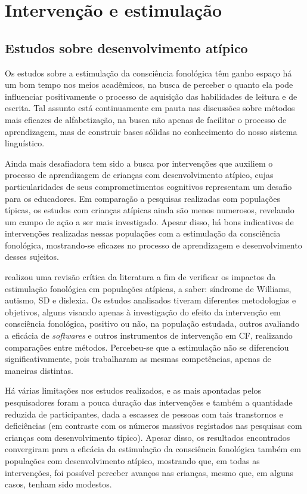 \documentclass[output=paper,colorlinks,citecolor=brown,booklanguage=portuguese]{langscibook}
\begin{document}
\section{Intervenção e estimulação}

\subsection{Estudos sobre desenvolvimento atípico}

Os estudos sobre a estimulação da consciência fonológica têm ganho espaço há um bom tempo nos meios acadêmicos, na busca de perceber o quanto ela pode influenciar positivamente o processo de aquisição das habilidades de leitura e de escrita. Tal assunto está continuamente em pauta nas discussões sobre métodos mais eficazes de alfabetização, na busca não apenas de facilitar o processo de aprendizagem, mas de construir bases sólidas no conhecimento do nosso sistema linguístico.

Ainda mais desafiadora tem sido a busca por intervenções que auxiliem o processo de aprendizagem de crianças com desenvolvimento atípico, cujas particularidades de seus comprometimentos cognitivos representam um desafio para os educadores. Em comparação a pesquisas realizadas com populações típicas, os estudos com crianças atípicas ainda são menos numerosos, revelando um campo de ação a ser mais investigado. Apesar disso, há bons indicativos de intervenções realizadas nessas populações com a estimulação da consciência fonológica, mostrando-se eficazes no processo de aprendizagem e desenvolvimento desses sujeitos.

\citet{Marques2018} realizou uma revisão crítica da literatura a fim de verificar os impactos da estimulação fonológica em populações atípicas, a saber: síndrome de Williams, autismo, SD e dislexia. Os estudos analisados tiveram diferentes metodologias e objetivos, alguns visando apenas à investigação do efeito da intervenção em consciência fonológica, positivo ou não, na população estudada, outros avaliando a eficácia de \emph{softwares} e outros instrumentos de intervenção em CF, realizando comparações entre métodos. Percebeu-se que a estimulação não se diferenciou significativamente, pois trabalharam as mesmas competências, apenas de maneiras distintas.

Há várias limitações nos estudos realizados, e as mais apontadas pelos pesquisadores foram a pouca duração das intervenções e também a quantidade reduzida de participantes, dada a escassez de pessoas com tais transtornos e deficiências (em contraste com os números massivos registados nas pesquisas com crianças com desenvolvimento típico). Apesar disso, os resultados encontrados convergiram para a eficácia da estimulação da consciência fonológica também em populações com desenvolvimento atípico, mostrando que, em todas as intervenções, foi possível perceber avanços nas crianças, mesmo que, em alguns casos, tenham sido modestos.
\end{document}
